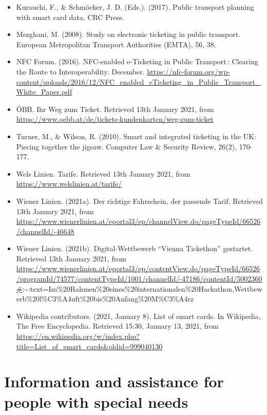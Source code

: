 \documentclass[
]{book}
\providecommand{\tightlist}{%
  \setlength{\itemsep}{0pt}\setlength{\parskip}{0pt}}
\begin{document}
\begin{itemize}
\tightlist
\item
  Kurauchi, F., \& Schmöcker, J. D. (Eds.). (2017). Public transport planning with smart card data. CRC Press.
\item
  Mezghani, M. (2008). Study on electronic ticketing in public transport. European Metropolitan Transport Authorities (EMTA), 56, 38.
\item
  NFC Forum. (2016). NFC-enabled e-Ticketing in Public Transport\,: Clearing the Route to Interoperability. December. \url{https://nfc-forum.org/wp-content/uploads/2016/12/NFC_enabled_eTicketing_in_Public_Transport_White_Paper.pdf}
\item
  ÖBB. Ihr Weg zum Ticket. Retrieved 13th January 2021, from \url{https://www.oebb.at/de/tickets-kundenkarten/weg-zum-ticket}
\item
  Turner, M., \& Wilson, R. (2010). Smart and integrated ticketing in the UK: Piecing together the jigsaw. Computer Law \& Security Review, 26(2), 170-177.
\item
  Wels Linien. Tarife. Retrieved 13th January 2021, from \url{https://www.welslinien.at/tarife/}
\item
  Wiener Linien. (2021a). Der richtige Fahrschein,
  der passende Tarif. Retrieved 13th January 2021, from \url{https://www.wienerlinien.at/eportal3/ep/channelView.do/pageTypeId/66526/channelId/-46648}
\item
  Wiener Linien. (2021b). Digital-Wettbewerb ``Vienna Tickethon'' gestartet. Retrieved 13th January 2021, from \url{https://www.wienerlinien.at/eportal3/ep/contentView.do/pageTypeId/66526/programId/74577/contentTypeId/1001/channelId/-47186/contentId/5002360\#}:\textasciitilde:text=Im\%20Rahmen\%20eines\%20internationalen\%20Hackathon,Wettbewerb\%20l\%C3\%A4uft\%20bis\%20Anfang\%20M\%C3\%A4rz
\item
  Wikipedia contributors. (2021, January 8). List of smart cards. In Wikipedia, The Free Encyclopedia. Retrieved 15:30, January 13, 2021, from \url{https://en.wikipedia.org/w/index.php?title=List_of_smart_cards\&oldid=999040130}
\end{itemize}

\hypertarget{information-and-assistance-for-people-with-special-needs}{%
\section{Information and assistance for people with special needs}\label{information-and-assistance-for-people-with-special-needs}}
\end{document}
